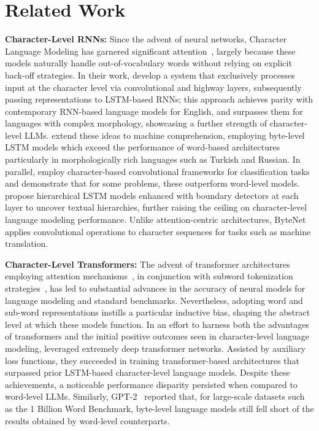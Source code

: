 \section{Related Work}
\label{section:related_work}

\textbf{Character-Level RNNs:} Since the advent of neural networks, Character Language Modeling has garnered significant attention~\citep{sutskever2011generating,mikolov2012subword,graves2013generating}, largely because these models naturally handle out-of-vocabulary words without relying on explicit back-off strategies. In their work, \cite{kim2016character} develop a system that exclusively processes input at the character level via convolutional and highway layers, subsequently passing representations to LSTM-based RNNs; this approach achieves parity with contemporary RNN-based language models for English, and surpasses them for languages with complex morphology, showcasing a further strength of character-level LLMs. \cite{kenter2018byte} extend these ideas to machine comprehension, employing byte-level LSTM models which exceed the performance of word-based architectures particularly in morphologically rich languages such as Turkish and Russian. In parallel, \cite{zhang2015character} employ character-based convolutional frameworks for classification tasks and demonstrate that for some problems, these outperform word-level models. \citet{chung2019hierarchical} propose hierarchical LSTM models enhanced with boundary detectors at each layer to uncover textual hierarchies, further raising the ceiling on character-level language modeling performance. Unlike attention-centric architectures, ByteNet~\cite{kalchbrenner2016neural} applies convolutional operations to character sequences for tasks such as machine translation.

\textbf{Character-Level Transformers:} The advent of transformer architectures employing attention mechanisms~\citep{vaswani2017attention}, in conjunction with subword tokenization strategies~\citep{sennrich-etal-2016-neural}, has led to substantial advances in the accuracy of neural models for language modeling and standard benchmarks. Nevertheless, adopting word and sub-word representations instills a particular inductive bias, shaping the abstract level at which these models function. In an effort to harness both the advantages of transformers and the initial positive outcomes seen in character-level language modeling, \citet{al2019character} leveraged extremely deep transformer networks. Assisted by auxiliary loss functions, they succeeded in training transformer-based architectures that surpassed prior LSTM-based character-level language models. Despite these achievements, a noticeable performance disparity persisted when compared to word-level LLMs. Similarly, GPT-2~\citep{radfordgpt2} reported that, for large-scale datasets such as the 1 Billion Word Benchmark, byte-level language models still fell short of the results obtained by word-level counterparts.

